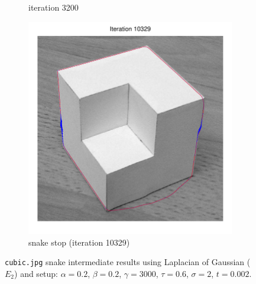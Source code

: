 \documentclass[11pt,a4paper]{article}
\begin{document}
\begin{figure}[H]
\begin{subfigure}[t]{0.21\textwidth}
        \caption{iteration 3200}
        \label{fig:cubic_log_3200}
    \end{subfigure}
    \begin{subfigure}[t]{0.21\textwidth}
        \includegraphics[width=\textwidth]{src/images/cubic_log_10329.pdf}
        \caption{snake stop (iteration 10329)}
        \label{fig:cubic_log_end}
    \end{subfigure}
    \caption{\texttt{cubic.jpg} snake intermediate results using Laplacian of
    Gaussian ($E_2$) and setup: $\alpha
= 0.2$, $\beta = 0.2$, $\gamma = 3000$, $\tau = 0.6$, $\sigma = 2$, $t = 0.002$.}
    \label{fig:cubic_log_intermediate}
\end{figure}
\end{document}
